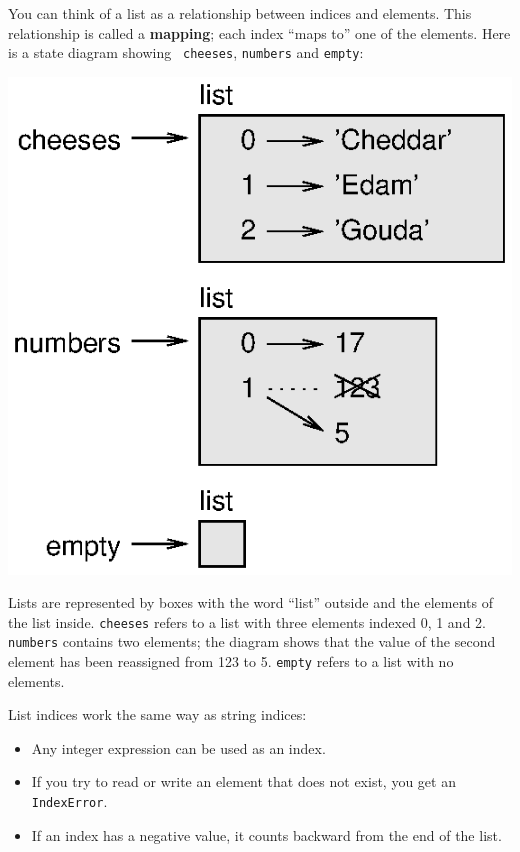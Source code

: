 \documentclass[10pt]{book}
\begin{document}
You can think of a list as a relationship between indices and
elements.  This relationship is called a {\bf mapping}; each index
``maps to'' one of the elements.  Here is a state diagram showing {\tt
cheeses}, {\tt numbers} and {\tt empty}:


\beforefig
\centerline{\includegraphics{figs/list_state.eps}}
\afterfig

Lists are represented by boxes with the word ``list'' outside
and the elements of the list inside.  {\tt cheeses} refers to
a list with three elements indexed 0, 1 and 2.
{\tt numbers} contains two elements; the diagram shows that the
value of the second element has been reassigned from 123 to 5.
{\tt empty} refers to a list with no elements.


List indices work the same way as string indices:

\begin{itemize}

\item Any integer expression can be used as an index.

\item If you try to read or write an element that does not exist, you
get an {\tt IndexError}.


\item If an index has a negative value, it counts backward from the
end of the list.

\end{itemize}
\end{document}
